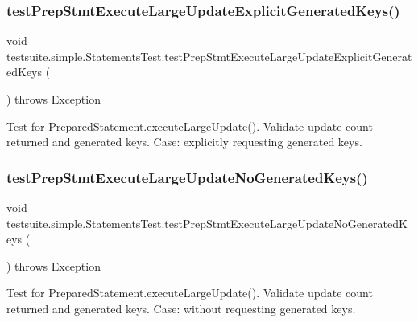 \subsubsection{\texorpdfstring{test\+Prep\+Stmt\+Execute\+Large\+Update\+Explicit\+Generated\+Keys()}{testPrepStmtExecuteLargeUpdateExplicitGeneratedKeys()}}
{\footnotesize\ttfamily void testsuite.\+simple.\+Statements\+Test.\+test\+Prep\+Stmt\+Execute\+Large\+Update\+Explicit\+Generated\+Keys (\begin{DoxyParamCaption}{ }\end{DoxyParamCaption}) throws Exception}

Test for Prepared\+Statement.\+execute\+Large\+Update(). Validate update count returned and generated keys. Case\+: explicitly requesting generated keys. \mbox{\label{classtestsuite_1_1simple_1_1_statements_test_aa679a99f5f5ae5968edee30a5c6f9c35}} 
\subsubsection{\texorpdfstring{test\+Prep\+Stmt\+Execute\+Large\+Update\+No\+Generated\+Keys()}{testPrepStmtExecuteLargeUpdateNoGeneratedKeys()}}
{\footnotesize\ttfamily void testsuite.\+simple.\+Statements\+Test.\+test\+Prep\+Stmt\+Execute\+Large\+Update\+No\+Generated\+Keys (\begin{DoxyParamCaption}{ }\end{DoxyParamCaption}) throws Exception}

Test for Prepared\+Statement.\+execute\+Large\+Update(). Validate update count returned and generated keys. Case\+: without requesting generated keys. \mbox{\label{classtestsuite_1_1simple_1_1_statements_test_aca0d1e60c7b8391bcc8af09b79a01389}} 

